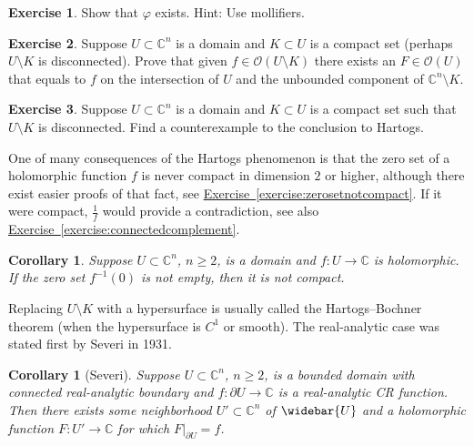 \documentclass[12pt,openany]{book}
\newcommand{\C}{{\mathbb{C}}}
\newcommand{\sO}{{\mathscr{O}}}
\theoremstyle{plain}
\newtheorem{cor}[thm]{Corollary}
\theoremstyle{remark}
\theoremstyle{definition}
\newenvironment{exbox}{%
    \def\FrameCommand{\vrule width 1pt \relax\hspace{10pt}}%
    \MakeFramed{\advance\hsize-\width\FrameRestore}%
}{%
    \endMakeFramed
}
\theoremstyle{exercise}
\newtheorem{exercise}{Exercise}[section]
\theoremstyle{example}
\newcommand{\exerciseref}[1]{\hyperref[#1]{Exercise~\ref*{#1}}}
\begin{document}
\begin{exbox}
\begin{exercise}
Show that $\varphi$ exists.  Hint: Use mollifiers.
\end{exercise}

\begin{exercise}
Suppose $U \subset \C^n$ is a domain and
$K \subset U$ is a compact set (perhaps $U \setminus
K$ is disconnected).
Prove that given $f \in \sO(U \setminus K)$ there exists an $F \in \sO(U)$ that equals
to $f$ on the intersection of $U$ and the unbounded component
of $\C^n \setminus K$.
\end{exercise}

\begin{exercise}
Suppose $U \subset \C^n$ is a domain and
$K \subset U$ is a compact set such that $U \setminus K$ is disconnected.
Find a counterexample to the conclusion to Hartogs.
\end{exercise}
\end{exbox}

One of many consequences of the Hartogs phenomenon is
that
the zero set of a holomorphic function $f$ is never compact in
dimension $2$ or higher, although there exist
easier proofs of that fact, see \exerciseref{exercise:zerosetnotcompact}.  If it
were compact, $\frac{1}{f}$ would provide a contradiction, see also
\exerciseref{exercise:connectedcomplement}.

\begin{cor}
Suppose $U \subset \C^n$, $n \geq 2$, is a domain and $f \colon U \to \C$ is
holomorphic.  If the zero set $f^{-1}(0)$ is not empty, then it is not compact.
\end{cor}

Replacing $U \setminus K$ with a hypersurface
is usually called the Hartogs--Bochner theorem (when the hypersurface is
$C^1$ or smooth).
The real-analytic case was stated first by Severi in 1931.

\begin{cor}[Severi]
Suppose $U \subset \C^n$, $n \geq 2$, is a bounded domain with connected real-analytic boundary and
$f \colon \partial U \to \C$ is a real-analytic CR function.  Then
there exists some neighborhood $U' \subset \C^n$ of $\widebar{U}$
and a holomorphic function $F \colon U' \to \C$ for which
$F|_{\partial U} = f$.
\end{cor}
\end{document}
